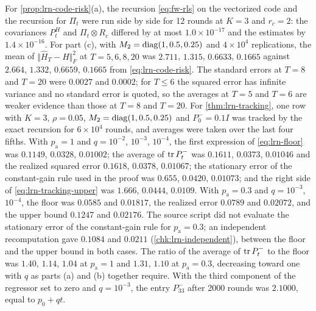 \begin{numcheck}\label{chk:lrn-tracking}
For \cref{prop:lrn-code-risk}(a), the recursion \cref{eq:fw-rls} on the vectorized code and the recursion for $\Pi_t$ were run side by side for 12 rounds at $K=3$ and $r_c=2$: the covariances $P^H_t$ and $\Pi_t\otimes R_c$ differed by at most $1.0\times10^{-17}$ and the estimates by $1.4\times10^{-16}$. For part (c), with $M_2=\operatorname{diag}(1,0.5,0.25)$ and $4\times10^4$ replications, the mean of $\Vert\hat H_T-H\Vert_F^2$ at $T=5,6,8,20$ was $2.711$, $1.315$, $0.6633$, $0.1665$ against $2.664$, $1.332$, $0.6659$, $0.1665$ from \cref{eq:lrn-code-risk}. The standard errors at $T=8$ and $T=20$ were $0.0027$ and $0.0002$; for $T\le6$ the squared error has infinite variance and no standard error is quoted, so the averages at $T=5$ and $T=6$ are weaker evidence than those at $T=8$ and $T=20$. For \cref{thm:lrn-tracking}, one row with $K=3$, $\rho=0.05$, $M_2=\operatorname{diag}(1,0.5,0.25)$ and $P^-_0=0.1I$ was tracked by the exact recursion for $6\times10^4$ rounds, and averages were taken over the last four fifths. With $p_{\mathrm a}=1$ and $q=10^{-2}$, $10^{-3}$, $10^{-4}$, the first expression of \cref{eq:lrn-floor} was $0.1149$, $0.0328$, $0.01002$; the average of $\operatorname{tr} P^-_t$ was $0.1611$, $0.0373$, $0.01046$ and the realized squared error $0.1618$, $0.0378$, $0.01067$; the stationary error of the constant-gain rule used in the proof was $0.655$, $0.0420$, $0.01073$; and the right side of \cref{eq:lrn-tracking-upper} was $1.666$, $0.0444$, $0.0109$. With $p_{\mathrm a}=0.3$ and $q=10^{-3}$, $10^{-4}$, the floor was $0.0585$ and $0.01817$, the realized error $0.0789$ and $0.02072$, and the upper bound $0.1247$ and $0.02176$. The source script did not evaluate the stationary error of the constant-gain rule for $p_{\mathrm a}=0.3$; an independent recomputation gave $0.1084$ and $0.0211$ (\cref{chk:lrn-independent}), between the floor and the upper bound in both cases. The ratio of the average of $\operatorname{tr} P^-_t$ to the floor was $1.40$, $1.14$, $1.04$ at $p_{\mathrm a}=1$ and $1.31$, $1.10$ at $p_{\mathrm a}=0.3$, decreasing toward one with $q$ as parts (a) and (b) together require. With the third component of the regressor set to zero and $q=10^{-3}$, the entry $P^-_{33}$ after 2000 rounds was $2.1000$, equal to $p_0+qt$.
\end{numcheck}

